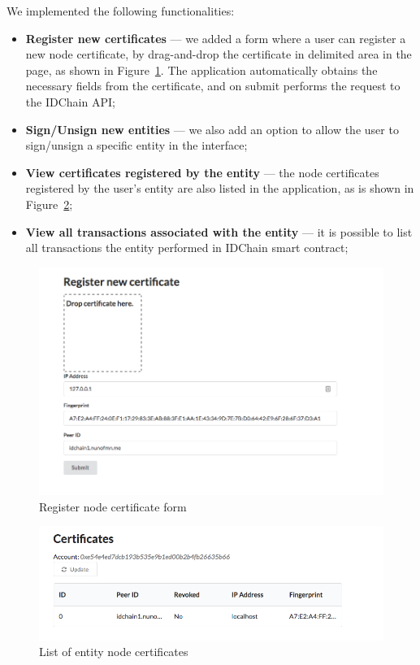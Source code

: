 We implemented the following functionalities:
\begin{itemize}
  \item \textbf{Register new certificates} — we added a form where a user can register a new node certificate, by drag-and-drop the certificate in delimited area in the page, as shown in Figure~\ref{fig:register-certificate}. The application automatically obtains the necessary fields from the certificate, and on submit performs the request to the IDChain API;
  \item \textbf{Sign/Unsign new entities} — we also add an option to allow the user to sign/unsign a specific entity in the interface;
  \item \textbf{View certificates registered by the entity} — the node certificates registered by the user's entity are also listed in the application, as is shown in Figure~\ref{fig:list-certificates};
  \item \textbf{View all transactions associated with the entity} — it is possible to list all transactions the entity performed in IDChain smart contract;
\end{itemize}

\begin{figure}[h!]
  \centering
  \includegraphics[scale=0.4]{Figures/app-register-certificate.png}
  \caption{Register node certificate form}
\label{fig:register-certificate}
\end{figure}

\begin{figure}[h!]
  \centering
  \includegraphics[scale=0.4]{Figures/app-list-certificates.png}
  \caption{List of entity node certificates}
\label{fig:list-certificates}
\end{figure}
